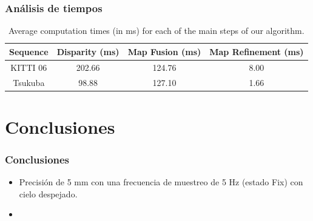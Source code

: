 \documentclass[compress]{beamer}
\begin{document}
%

\begin{frame}
	\frametitle{Análisis de tiempos}
	\begin{table}[!htb]
		\centering
		\small
		\begin{tabular}{cccc}
			\toprule
			Sequence & Disparity (ms) & Map Fusion (ms) & Map Refinement (ms) \\
			\midrule
			KITTI 06 & 202.66 & 124.76 & 8.00 \\
			Tsukuba & 98.88 & 127.10 & 1.66 \\
			\bottomrule
		\end{tabular}
		\caption{Average computation times (in ms) for each of the main steps of our algorithm.} \label{table:table_times}
	\end{table}
\end{frame}

\section{Conclusiones}

\begin{frame}
	\frametitle{Conclusiones}
	\begin{itemize}
		\item Precisión de 5 mm con una frecuencia de muestreo de 5 Hz (estado Fix) con cielo despejado.
		\item 
	\end{itemize}
\end{frame}
\end{document}
